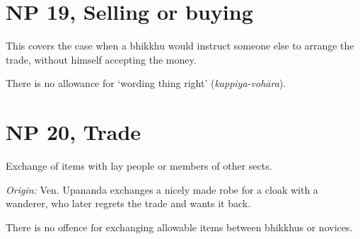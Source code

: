 \section{NP 19, Selling or buying}

This covers the case when a bhikkhu would instruct someone else to
arrange the trade, without himself accepting the money.

There is no allowance for `wording thing right' (\emph{kappiya-vohāra}).

\section{NP 20, Trade}

Exchange of items with lay people or members of other sects.

\emph{Origin:} Ven. Upananda exchanges a nicely made robe for a cloak
with a wanderer, who later regrets the trade and wants it back.

There is no offence for exchanging allowable items between bhikkhus or
novices.

